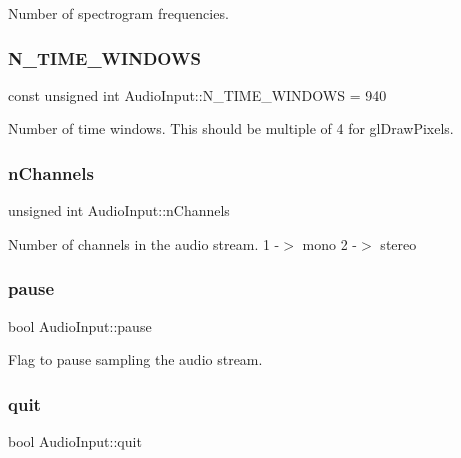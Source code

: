 Number of spectrogram frequencies. \hypertarget{classAudioInput_a8b6b39b0558d7db54234f1e39a38a775}{}\label{classAudioInput_a8b6b39b0558d7db54234f1e39a38a775} 
\subsubsection{\texorpdfstring{N\+\_\+\+T\+I\+M\+E\+\_\+\+W\+I\+N\+D\+O\+WS}{N\_TIME\_WINDOWS}}
{\ttfamily const unsigned int Audio\+Input\+::\+N\+\_\+\+T\+I\+M\+E\+\_\+\+W\+I\+N\+D\+O\+WS = 940\hspace{0.3cm}{\ttfamily [static]}}

Number of time windows. This should be multiple of 4 for gl\+Draw\+Pixels. \hypertarget{classAudioInput_a364801e7fa59b6c8ed881262b2085d42}{}\label{classAudioInput_a364801e7fa59b6c8ed881262b2085d42} 
\subsubsection{\texorpdfstring{n\+Channels}{nChannels}}
{\ttfamily unsigned int Audio\+Input\+::n\+Channels\hspace{0.3cm}{\ttfamily [protected]}}

Number of channels in the audio stream. 1 -\/$>$ mono 2 -\/$>$ stereo \hypertarget{classAudioInput_a3ff41f73529f77872f6ab585d7cf706a}{}\label{classAudioInput_a3ff41f73529f77872f6ab585d7cf706a} 
\subsubsection{\texorpdfstring{pause}{pause}}
{\ttfamily bool Audio\+Input\+::pause\hspace{0.3cm}{\ttfamily [protected]}}

Flag to pause sampling the audio stream. \hypertarget{classAudioInput_aceef1c12e4f78624ed695371adf495df}{}\label{classAudioInput_aceef1c12e4f78624ed695371adf495df} 
\subsubsection{\texorpdfstring{quit}{quit}}
{\ttfamily bool Audio\+Input\+::quit\hspace{0.3cm}{\ttfamily [protected]}}

